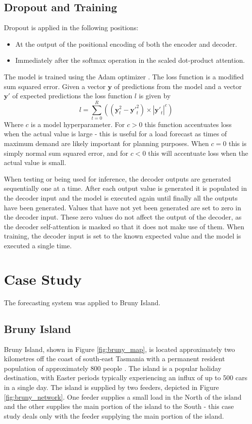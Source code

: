 \documentclass[conference]{IEEEtran}
\begin{document}
\subsection{Dropout and Training}
Dropout is applied in the following positions:
\begin{itemize}
	\item At the output of the positional encoding of both the encoder and decoder.
	\item Immediately after the softmax operation in the scaled dot-product attention.
\end{itemize}
The model is trained using the Adam optimizer \cite{Kingma2014}.
The loss function is a modified sum squared error.
Given a vector $\boldsymbol{y}$ of predictions from the model and a vector $\boldsymbol{y'}$ of expected predictions the loss function $l$ is given by 
\begin{equation}
l = \sum_{t=0}^{R}((\boldsymbol{y}_t^2 - \boldsymbol{y'}_t^2) \times |\boldsymbol{y'}_t|^c)
\end{equation}
Where $c$ is a model hyperparameter.
For $c>0$ this function accentuates loss when the actual value is large - this is useful for a load forecast as times of maximum demand are likely important for planning purposes.
When $c=0$ this is simply normal sum squared error, and for $c<0$ this will accentuate loss when the actual value is small.

When testing or being used for inference, the decoder outputs are generated sequentially one at a time.
After each output value is generated it is populated in the decoder input and the model is executed again until finally all the outputs have been generated.
Values that have not yet been generated are set to zero in the decoder input.
These zero values do not affect the output of the decoder, as the decoder self-attention is masked so that it does not make use of them.
When training, the decoder input is set to the known expected value and the model is executed a single time.


\section{Case Study}
The forecasting system was applied to Bruny Island.

\subsection{Bruny Island}
Bruny Island, shown in Figure \ref{fig:bruny_map}, is located approximately two kilometres off the coast of south-east Tasmania with a permanent resident population of approximately 800 people \cite{census2016}.
The island is a popular holiday destination, with Easter periods typically experiencing an influx of up to 500 cars in a single day.
The island is supplied by two feeders, depicted in Figure \ref{fig:bruny_network}.
One feeder supplies a small load in the North of the island and the other supplies the main portion of the island to the South - this case study deals only with the feeder supplying the main portion of the island.
\end{document}
